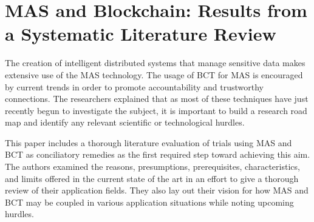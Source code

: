 \section{\ac{MAS} and Blockchain: Results from a Systematic Literature Review}

The creation of intelligent distributed systems that manage sensitive data makes extensive use of the \ac{MAS} technology. The usage of \ac{BCT} for \ac{MAS}  is encouraged by current trends in order to promote accountability and trustworthy connections. The researchers explained that as most of these techniques have just recently begun to investigate the subject, it is important to build a research road map and identify any relevant scientific or technological hurdles.

This paper\cite{literature} includes a thorough literature evaluation of trials using \ac{MAS} and \ac{BCT} as conciliatory remedies as the first required step toward achieving this aim. The authors examined the reasons, presumptions, prerequisites, characteristics, and limits offered in the current state of the art in an effort to give a thorough review of their application fields. They also lay out their vision for how \ac{MAS} and \ac{BCT} may be coupled in various application situations while noting upcoming hurdles.

